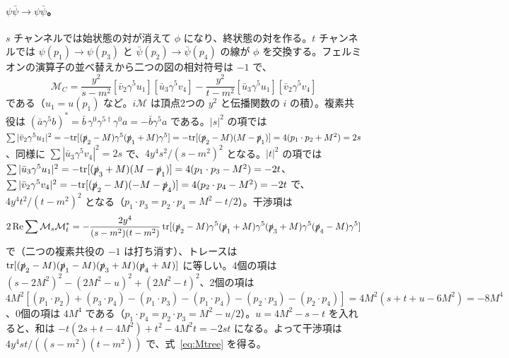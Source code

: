 \documentclass[a4paper,10pt]{ltjsarticle}
\begin{document}
\paragraph{$\psi\bar\psi\to\psi\bar\psi$。}$s$ チャンネルでは始状態の対が消えて $\phi$ になり、終状態の対を作る。$t$ チャンネルでは $\psi(p_1)\to\psi(p_3)$ と $\bar\psi(p_2)\to\bar\psi(p_4)$ の線が $\phi$ を交換する。フェルミオンの演算子の並べ替えから二つの図の相対符号は $-1$ で、
\begin{equation*}
\mathcal M_C=\frac{y^2}{s-m^2}[\bar v_2\gamma^5u_1][\bar u_3\gamma^5v_4]-\frac{y^2}{t-m^2}[\bar u_3\gamma^5u_1][\bar v_2\gamma^5v_4]
\end{equation*}
である（$u_1=u(p_1)$ など。$i\mathcal M$ は頂点2つの $y^2$ と伝播関数の $i$ の積）。複素共役は $(\bar a\gamma^5b)^*=\bar b\,\gamma^0\gamma^{5\dagger}\gamma^0a=-\bar b\gamma^5a$ である。$|s|^2$ の項では $\sum|\bar v_2\gamma^5u_1|^2=-\mathrm{tr}[(\slashed p_2-M)\gamma^5(\slashed p_1+M)\gamma^5]=-\mathrm{tr}[(\slashed p_2-M)(M-\slashed p_1)]=4(p_1\cdot p_2+M^2)=2s$、同様に $\sum|\bar u_3\gamma^5v_4|^2=2s$ で、$4y^4s^2/(s-m^2)^2$ となる。$|t|^2$ の項では $\sum|\bar u_3\gamma^5u_1|^2=-\mathrm{tr}[(\slashed p_3+M)(M-\slashed p_1)]=4(p_1\cdot p_3-M^2)=-2t$、$\sum|\bar v_2\gamma^5v_4|^2=-\mathrm{tr}[(\slashed p_2-M)(-M-\slashed p_4)]=4(p_2\cdot p_4-M^2)=-2t$ で、$4y^4t^2/(t-m^2)^2$ となる（$p_1\cdot p_3=p_2\cdot p_4=M^2-t/2$）。干渉項は
\begin{equation*}
2\,\mathrm{Re}\sum\mathcal M_s\mathcal M_t^*=-\frac{2y^4}{(s-m^2)(t-m^2)}\,\mathrm{tr}[(\slashed p_2-M)\gamma^5(\slashed p_1+M)\gamma^5(\slashed p_3+M)\gamma^5(\slashed p_4-M)\gamma^5]
\end{equation*}
で（二つの複素共役の $-1$ は打ち消す）、トレースは $\mathrm{tr}[(\slashed p_2-M)(\slashed p_1-M)(\slashed p_3+M)(\slashed p_4+M)]$ に等しい。4個の項は $(s-2M^2)^2-(2M^2-u)^2+(2M^2-t)^2$、2個の項は $4M^2[(p_1\cdot p_2)+(p_3\cdot p_4)-(p_1\cdot p_3)-(p_1\cdot p_4)-(p_2\cdot p_3)-(p_2\cdot p_4)]=4M^2(s+t+u-6M^2)=-8M^4$、0個の項は $4M^4$ である（$p_1\cdot p_4=p_2\cdot p_3=M^2-u/2$）。$u=4M^2-s-t$ を入れると、和は $-t(2s+t-4M^2)+t^2-4M^2t=-2st$ になる。よって干渉項は $4y^4st/((s-m^2)(t-m^2))$ で、式~\eqref{eq:Mtree} を得る。
\end{document}
